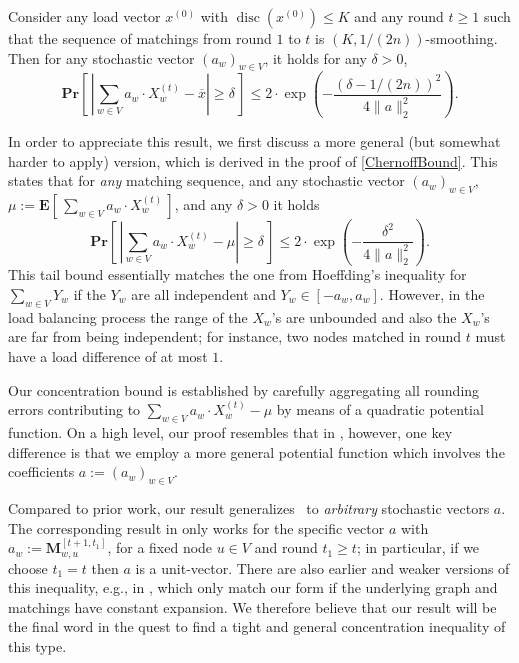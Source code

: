 \documentclass[twoside,leqno]{article}
\newcommand{\Pro}[1]{\mathbf{Pr} \left[\,#1\,\right]}
\newcommand{\Ex}[1]{\mathbf{E} \left[\,#1\,\right]}
\newcommand{\M}{\mathbf{M}}
\DeclareMathOperator{\discr}{\mathrm{disc}}
\DeclareMathOperator{\1}{\mathbf{1}}
\numberwithin{equation}{section}
\begin{document}
\begin{lemma}
Consider any load vector $x^{(0)}$ with $\discr(x^{(0)}) \leq K$ and any round $t\ge 1$ 
such that the sequence of matchings from round $1$ to $t$ is $(K,1/(2n))$-smoothing. Then for any stochastic vector $(a_w)_{w \in V}$, it holds for any $\delta > 0$,
\[
  \Pro{ 
        \left| \sum_{w \in V} a_w \cdot X_w^{(t)} - \overline{x} \right| \geq \delta} \leq 2 \cdot \exp\left( -\frac{ (\delta-1/(2n))^2}
        { 4 \|a\|_2^2} \right).
\]
\end{lemma}
In order to appreciate this result, we first discuss a more general (but somewhat harder to apply) version, which is derived in the proof of \cref{ChernoffBound}. This states that for \emph{any} matching sequence, and any stochastic vector $(a_w)_{w \in V}$, $\mu:= \Ex{\sum_{w \in V} a_w \cdot X_w^{(t)}}$,
and any $\delta > 0$ it holds
\[
  \Pro{ 
        \left| \sum_{w \in V} a_w \cdot X_w^{(t)} - \mu \right| \geq \delta} \leq 2 \cdot \exp\left( -\frac{ \delta^2}
        { 4 \|a\|_2^2} \right).
\]
This tail bound essentially matches the one from Hoeffding's inequality for $\sum_{w \in V} Y_w$ if the $Y_w$ are all independent and $Y_w \in [-a_w,a_w]$. However, in the load balancing process the range of the $X_w$'s are unbounded and also the $X_w$'s are far from being independent; for instance, two nodes matched in round $t$ must have a load difference of at most $1$.
 
Our concentration bound is established by carefully aggregating all rounding errors contributing to $\sum_{w \in V} a_w \cdot X_w^{(t)} - \mu$ by means of a quadratic potential function. On a high level, our proof resembles that in \cite{DBLP:conf/focs/SauerwaldS12}, however, one key difference is that we employ a more general potential function which involves the coefficients $a:=(a_w)_{w \in V}$.

Compared to prior work, our result generalizes~\cite[Lemma~3.5]{DBLP:conf/focs/SauerwaldS12}
to \emph{arbitrary} stochastic vectors $a$. The corresponding result in \cite{DBLP:conf/focs/SauerwaldS12} only works for the specific vector $a$ with $a_w:=\M_{w,u}^{[t+1,t_1]}$, for a fixed node $u\in V$ and round $t_1 \geq t$; in particular, if we choose $t_1=t$ then $a$ is a unit-vector.  There are also earlier and weaker versions of this inequality, e.g., in \cite[Theorem~4.6]{DBLP:conf/stoc/FriedrichS09}, which only match our form if the underlying graph and matchings have constant expansion. We therefore believe that our result will be the final word in the quest to find a tight and general concentration inequality of this type.
\end{document}
